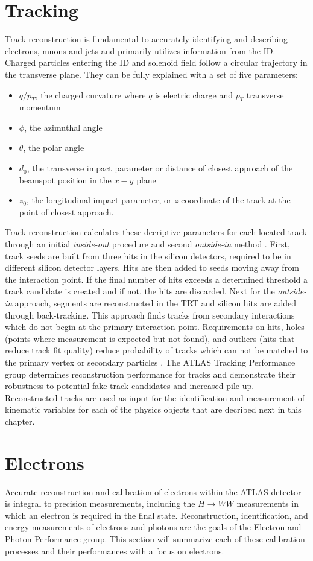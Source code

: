 \section{Tracking}
Track reconstruction is fundamental to accurately identifying and describing electrons, muons and jets and primarily utilizes information from the ID. Charged particles entering the ID and solenoid field follow a circular trajectory in the transverse plane. They can be fully explained with a set of five parameters:
\begin{itemize}
\item $q/p_T$, the charged curvature where $q$ is electric charge and $p_T$ transverse momentum
\item $\phi$, the azimuthal angle
\item $\theta$, the polar angle
\item $d_0$, the transverse impact parameter or distance of closest approach of the beamspot position in the $x-y$ plane
\item $z_0$, the longitudinal impact parameter, or $z$ coordinate of the track at the point of closest approach. 
\end{itemize}
Track reconstruction calculates these decriptive parameters for each located track through an initial \textit{inside-out} procedure and second \textit{outside-in} method \cite{tracking}. First, track seeds are built from three hits in the silicon detectors, required to be in different silicon detector layers. Hits are then added to seeds moving away from the interaction point. If the final number of hits exceeds a determined threshold a track candidate is created and if not, the hits are discarded. Next for the \textit{outside-in} approach, segments are reconstructed in the TRT and silicon hits are added  through back-tracking. This approach finds tracks from secondary interactions which do not begin at the primary interaction point. Requirements on hits, holes (points where measurement is expected but not found), and outliers (hits that reduce track fit quality) reduce probability of tracks which can not be matched to the primary vertex or secondary particles \cite{IDreconstruction}. The ATLAS Tracking Performance group determines reconstruction performance for tracks and demonstrate their robustness to potential fake track candidates and increased pile-up. Reconstructed tracks are used as input for the identification and measurement of kinematic variables for each of the physics objects that are decribed next in this chapter. 

\section{Electrons}
Accurate reconstruction and calibration of electrons within the ATLAS detector is integral to precision measurements, including the $H\rightarrow WW$ measurements in which an electron is required in the final state. Reconstruction, identification, and energy measurements of electrons and photons are the goals of the Electron and Photon Performance group.  This section will summarize each of these calibration processes and their performances with a focus on electrons. 

